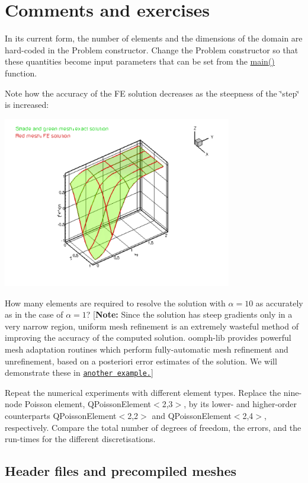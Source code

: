  

\hypertarget{index_exercises}{}\section{Comments and exercises}\label{index_exercises}

\begin{DoxyEnumerate}
\item In its current form, the number of elements and the dimensions of the domain are hard-\/coded in the {\ttfamily Problem} constructor. Change the {\ttfamily Problem} constructor so that these quantities become input parameters that can be set from the {\ttfamily \hyperlink{two__d__poisson_8cc_ae66f6b31b5ad750f1fe042a706a4e3d4}{main()}} function.
\item Note how the accuracy of the FE solution decreases as the steepness of the \char`\"{}step\char`\"{} is increased\+:  
\begin{DoxyImage}
\includegraphics[width=0.75\textwidth]{alpha}
\end{DoxyImage}
 How many elements are required to resolve the solution with $ \alpha = 10 $ as accurately as in the case of $ \alpha = 1$? \mbox{[}{\bfseries Note\+:} Since the solution has steep gradients only in a very narrow region, uniform mesh refinement is an extremely wasteful method of improving the accuracy of the computed solution. {\ttfamily oomph-\/lib} provides powerful mesh adaptation routines which perform fully-\/automatic mesh refinement and unrefinement, based on a posteriori error estimates of the solution. We will demonstrate these in \href{../../../poisson/fish_poisson/html/index.html}{\tt another example.}\mbox{]}
\item Repeat the numerical experiments with different element types. Replace the nine-\/node Poisson element, {\ttfamily Q\+Poisson\+Element$<$2,3$>$}, by its lower-\/ and higher-\/order counterparts {\ttfamily Q\+Poisson\+Element$<$2,2$>$} and {\ttfamily Q\+Poisson\+Element$<$2,4$>$}, respectively. Compare the total number of degrees of freedom, the errors, and the run-\/times for the different discretisations.
\end{DoxyEnumerate}\hypertarget{index_precompile_mesh}{}\subsection{Header files and precompiled meshes}\label{index_precompile_mesh}
